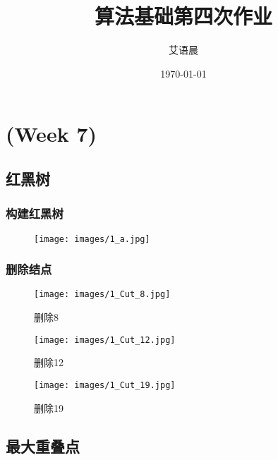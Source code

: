 \documentclass[]{report}
\title{算法基础第四次作业}
\author{艾语晨}
\date{\today}
\begin{document}
\theoremstyle{definition} \newtheorem{theorem}{Thm}[section] %
\theoremstyle{definition} \newtheorem{definition}{Def}[section] %
\theoremstyle{plain} \newtheorem{lemma}{lemma}[section] %

	\maketitle
	\newpage

	\tableofcontents
	\newpage

	\chapter{(Week 7)}
	\section{红黑树}
		\subsection{构建红黑树}
		\begin{figure}[h!]
			\centering
			\begin{minipage}{40em}
				\centering
				\texttt{[image: images/1\_a.jpg]}
			\end{minipage}
		\end{figure}
		\subsection{删除结点}
		\begin{figure}[h!]
			\centering
			\begin{minipage}{13em}
				\centering
				\texttt{[image: images/1\_Cut\_8.jpg]}
				\caption{删除8}
			\end{minipage}
			\begin{minipage}{13em}
				\centering
				\texttt{[image: images/1\_Cut\_12.jpg]}
				\caption{删除12}
			\end{minipage}
			\begin{minipage}{13em}
				\centering
				\texttt{[image: images/1\_Cut\_19.jpg]}
				\caption{删除19}
			\end{minipage}
		\end{figure}


		\section{最大重叠点}
\end{document}
